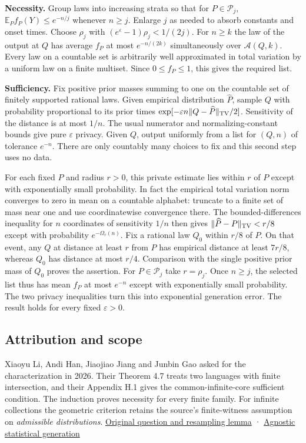 \documentclass[11pt]{article}
\begin{document}
\textbf{Necessity.} Group laws into increasing strata so that for \(P\in\mathcal P_j\), \(\mathbb E_P f_P(Y)\le e^{-n/j}\) whenever \(n\ge j\). Enlarge \(j\) as needed to absorb constants and onset times. Choose \(\rho_j\) with \((e^\varepsilon-1)\rho_j<1/(2j)\). For \(n\ge k\) the law of the output at \(Q\) has average \(f_P\) at most \(e^{-n/(2k)}\) simultaneously over \(\mathcal A(Q,k)\). Every law on a countable set is arbitrarily well approximated in total variation by a uniform law on a finite multiset. Since \(0\le f_P\le1\), this gives the required list.

\textbf{Sufficiency.} Fix positive prior masses summing to one on the countable set of finitely supported rational laws. Given empirical distribution \(\widehat P\), sample \(Q\) with probability proportional to its prior times \(\exp[-\varepsilon n\|Q-\widehat P\|_{\rm TV}/2]\). Sensitivity of the distance is at most \(1/n\). The usual numerator and normalizing-constant bounds give pure \(\varepsilon\) privacy. Given \(Q\), output uniformly from a list for \((Q,n)\) of tolerance \(e^{-n}\). There are only countably many choices to fix and this second step uses no data.

For each fixed \(P\) and radius \(r>0\), this private estimate lies within \(r\) of \(P\) except with exponentially small probability. In fact the empirical total variation norm converges to zero in mean on a countable alphabet: truncate to a finite set of mass near one and use coordinatewise convergence there. The bounded-differences inequality for \(n\) coordinates of sensitivity \(1/n\) then gives \(\|\widehat P-P\|_{\rm TV}<r/8\) except with probability \(e^{-\Omega_r(n)}\). Fix a rational law \(Q_0\) within \(r/8\) of \(P\). On that event, any \(Q\) at distance at least \(r\) from \(P\) has empirical distance at least \(7r/8\), whereas \(Q_0\) has distance at most \(r/4\). Comparison with the single positive prior mass of \(Q_0\) proves the assertion. For \(P\in\mathcal P_j\) take \(r=\rho_j\). Once \(n\ge j\), the selected list thus has mean \(f_P\) at most \(e^{-n}\) except with exponentially small probability. The two privacy inequalities turn this into exponential generation error. The result holds for every fixed \(\varepsilon>0\).

\subsection{Attribution and scope}\label{attribution-and-scope}

Xiaoyu Li, Andi Han, Jiaojiao Jiang and Junbin Gao asked for the characterization in 2026. Their Theorem 4.7 treats two languages with finite intersection, and their Appendix H.1 gives the common-infinite-core sufficient condition. The induction proves necessity for every finite family. For infinite collections the geometric criterion retains the source's finite-witness assumption on \emph{admissible distributions}. \href{https://arxiv.org/abs/2604.07238v2}{Original question and resampling lemma} · \href{https://arxiv.org/abs/2601.23258}{Agnostic statistical generation}
\end{document}
